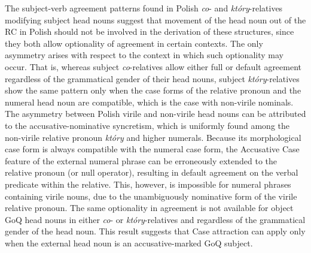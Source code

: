 \documentclass[output=paper]{langsci/langscibook}
\begin{document}
The subject-verb agreement patterns found in Polish \textit{co}{}- and \textit{który}{}-relatives modifying subject head nouns suggest that movement of the head noun out of the RC in Polish should not be involved in the derivation of these structures, since they both allow optionality of agreement in certain contexts. The only asymmetry arises with respect to the context in which such optionality may occur. That is, whereas subject \textit{co}{}-relatives allow either full or default agreement regardless of the grammatical gender of their head nouns, subject \textit{który}{}-relatives show the same pattern only when the case forms of the relative pronoun and the numeral head noun are compatible, which is the case with non-virile nominals. The asymmetry between Polish virile and non-virile head nouns can be attributed to the accusative-nominative syncretism, which is uniformly found among the non-virile relative pronoun \textit{który} and higher numerals. Because its morphological case form is always compatible with the numeral case form, the Accusative Case feature of the external numeral phrase can be erroneously extended to the relative pronoun (or null operator), resulting in default agreement on the verbal predicate within the relative. This, however, is impossible for numeral phrases containing virile nouns, due to the unambiguously nominative form of the virile relative pronoun. The same optionality in agreement is not available for object GoQ head nouns in either \textit{co}{}- or \textit{który}{}-relatives and regardless of the grammatical gender of the head noun. This result suggests that Case attraction can apply only when the external head noun is an accusative-marked GoQ subject.
% 
% 
% 
% 
% 
\end{document}
